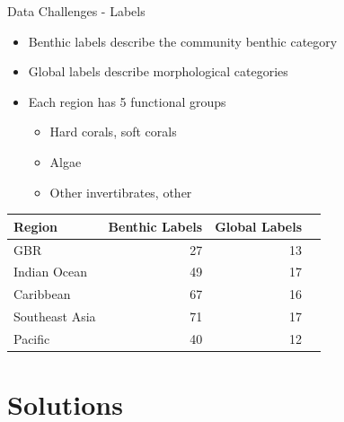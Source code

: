 \documentclass{beamer}
\begin{document}
            \begin{frame}{Data Challenges - Labels}
                \begin{itemize}
                  \item Benthic labels describe the community benthic category
                  \item Global labels describe morphological categories
                  \item Each region has 5 functional groups
                  \begin{itemize}
                    \item Hard corals, soft corals
                    \item Algae
                    \item Other invertibrates, other
                  \end{itemize}
                \end{itemize}

              \begin{center}
                  \begin{table}
                      \begin{tabular}{l r r r}
                          Region                &   Benthic Labels         &   Global Labels   \\ \hline
                          GBR                   &   27                     &   13              \\
                          Indian Ocean          &   49                     &   17              \\
                          Caribbean             &   67                     &   16              \\
                          Southeast Asia        &   71                     &   17              \\
                          Pacific               &   40                     &   12              \\
                      \end{tabular}
                  \end{table}
              \end{center}
            \end{frame}

      \section{Solutions}
\end{document}
